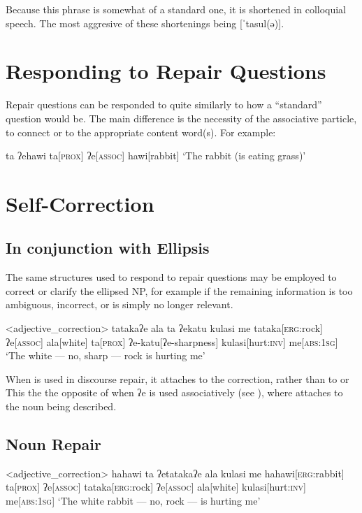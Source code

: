 Because this phrase is somewhat of a standard one, it is shortened in colloquial speech. The most aggresive of these shortenings being [ˈtasul(ə)].

\section{Responding to Repair Questions}\label{sec:repair_response}

Repair questions can be responded to quite similarly to how a ``standard'' question would be. The main difference is the necessity of the associative particle,  to connect  or  to the appropriate content word(s). For example:

\ex
\begingl
\glpreamble ta ʔehawi
\endpreamble
ta[\textsc{prox}]
ʔe[\textsc{assoc}]
hawi[rabbit]
\glft `The rabbit (is eating grass)'
\endgl
\xe
\section{Self-Correction}
\subsection{In conjunction with  Ellipsis}

The same structures used to respond to repair questions may be employed to correct or clarify the ellipsed NP, for example if the remaining information  is too ambiguous, incorrect, or is simply no longer relevant.

\ex<adjective_correction>
\begingl
\glpreamble tatakaʔe ala ta ʔekatu kulasi me
\endpreamble
tataka[\textsc{erg:}rock]
ʔe[\textsc{assoc}]
ala[white]
ta[\textsc{prox}]
ʔe-katu[ʔe-sharpness]
kulasi[hurt\textsc{:inv}]
me[\textsc{abs:1sg}]
\glft `The white --- no, sharp --- rock is hurting me'
\endgl
\xe

When  is used in discourse repair, it attaches to the correction, rather than to  or  This the the opposite of when ʔe is used associatively (see ), where  attaches to the noun being described.


\subsection{Noun Repair}
\ex<adjective_correction>
\begingl
\glpreamble hahawi ta ʔetatakaʔe ala kulasi me
\endpreamble
hahawi[\textsc{erg:}rabbit]
ta[\textsc{prox}]
ʔe[\textsc{assoc}]
tataka[\textsc{erg:}rock]
ʔe[\textsc{assoc}]
ala[white]
kulasi[hurt\textsc{:inv}]
me[\textsc{abs:1sg}]
\glft `The white rabbit --- no, rock ---  is hurting me'
\endgl
\xe

